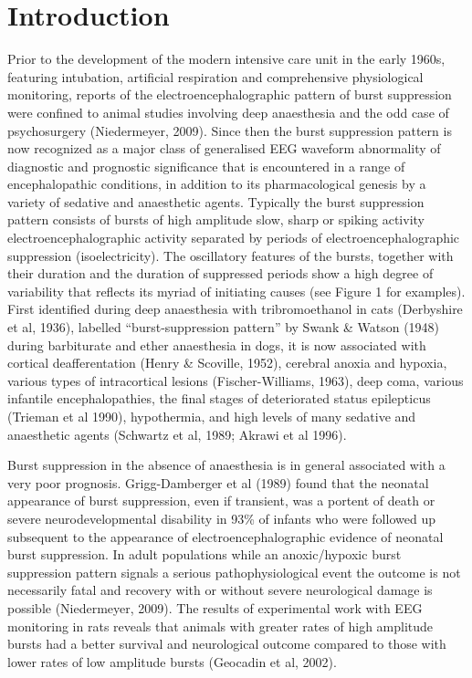 \documentclass[a4paper,12pt]{article}
\begin{document}
\section{Introduction}
Prior to the development of the modern intensive care unit in the early
1960s, featuring intubation, artificial respiration and comprehensive
physiological monitoring, reports of the electroencephalographic
pattern of burst suppression were confined to animal studies involving
deep anaesthesia and the odd case of psychosurgery (Niedermeyer,
2009). Since then the burst suppression pattern is now recognized as
a major class of generalised EEG waveform abnormality of diagnostic
and prognostic significance that is encountered in a range of
encephalopathic conditions, in addition to its pharmacological genesis
by a variety of sedative and anaesthetic agents. Typically the burst
suppression pattern consists of bursts of high amplitude slow, sharp or
spiking activity electroencephalographic activity separated by periods
of electroencephalographic suppression (isoelectricity). The oscillatory
features of the bursts, together with their duration and the duration of
suppressed periods show a high degree of variability that reflects its
myriad of initiating causes (see Figure 1 for examples). First identified
during deep anaesthesia with tribromoethanol in cats (Derbyshire et al,
1936), labelled “burst-suppression pattern” by Swank \& Watson (1948) during barbiturate and ether anaesthesia in dogs, it is now
associated with cortical deafferentation (Henry \& Scoville, 1952),
cerebral anoxia and hypoxia, various types of intracortical lesions
(Fischer-Williams, 1963), deep coma, various infantile
encephalopathies, the final stages of deteriorated status epilepticus
(Trieman et al 1990), hypothermia, and high levels of many sedative
and anaesthetic agents (Schwartz et al, 1989; Akrawi et al 1996).

Burst suppression in the absence of anaesthesia is in general
associated with a very poor prognosis. Grigg-Damberger et al (1989)
found that the neonatal appearance of burst suppression, even if
transient, was a portent of death or severe neurodevelopmental
disability in 93\% of infants who were followed up subsequent to the
appearance of electroencephalographic evidence of neonatal burst
suppression. In adult populations while an anoxic/hypoxic burst
suppression pattern signals a serious pathophysiological event the
outcome is not necessarily fatal and recovery with or without severe
neurological damage is possible (Niedermeyer, 2009). The results of
experimental work with EEG monitoring in rats reveals that animals with
greater rates of high amplitude bursts had a better survival and
neurological outcome compared to those with lower rates of low
amplitude bursts (Geocadin et al, 2002).
\end{document}
